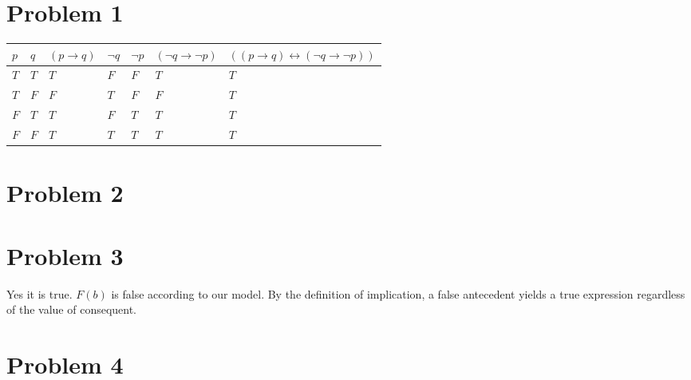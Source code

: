 \documentclass{article}%
\begin{document}
\section*{Problem 1}

\begin{tabular}{| l | l | l | l | l | l | l |}
    \hline
    $p$ & $q$ & $(p \rightarrow q)$ & $\neg q$ & $\neg p$ & $(\neg q \rightarrow \neg p)$ & $((p \rightarrow q) \leftrightarrow (\neg q \rightarrow \neg p))$ \\ \hline
    $T$ & $T$ & $T$                 & $F$      & $F$      & $T$                           & $T$ \\ \hline
    $T$ & $F$ & $F$                 & $T$      & $F$      & $F$                           & $T$ \\ \hline
    $F$ & $T$ & $T$                 & $F$      & $T$      & $T$                           & $T$ \\ \hline
    $F$ & $F$ & $T$                 & $T$      & $T$      & $T$                           & $T$ \\ \hline
\end{tabular}
\section*{Problem 2}

\section*{Problem 3}
Yes it is true. $F(b)$ is false according to our model. By the definition of implication, a false antecedent yields a true expression
regardless of the value of consequent.

\section*{Problem 4}
\end{document}
